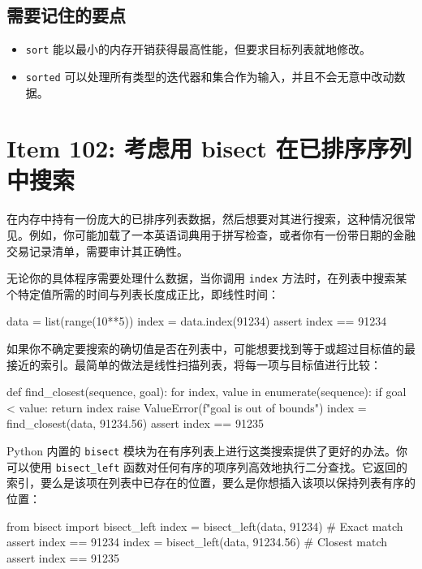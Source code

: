 \subsection{需要记住的要点}

\begin{itemize}
\item \texttt{sort} 能以最小的内存开销获得最高性能，但要求目标列表就地修改。
\item \texttt{sorted} 可以处理所有类型的迭代器和集合作为输入，并且不会无意中改动数据。
\end{itemize}

\section{Item 102: 考虑用 bisect 在已排序序列中搜索}

在内存中持有一份庞大的已排序列表数据，然后想要对其进行搜索，这种情况很常见。例如，你可能加载了一本英语词典用于拼写检查，或者你有一份带日期的金融交易记录清单，需要审计其正确性。

无论你的具体程序需要处理什么数据，当你调用 \texttt{index} 方法时，在列表中搜索某个特定值所需的时间与列表长度成正比，即线性时间：

\begin{codebox}[python]
data = list(range(10**5))
index = data.index(91234)
assert index == 91234
\end{codebox}

如果你不确定要搜索的确切值是否在列表中，可能想要找到等于或超过目标值的最接近的索引。最简单的做法是线性扫描列表，将每一项与目标值进行比较：

\begin{codebox}[python]
def find_closest(sequence, goal):
    for index, value in enumerate(sequence):
        if goal < value:
            return index
    raise ValueError(f"{goal} is out of bounds")
index = find_closest(data, 91234.56)
assert index == 91235
\end{codebox}

Python 内置的 \texttt{bisect} 模块为在有序列表上进行这类搜索提供了更好的办法。你可以使用 \texttt{bisect\_left} 函数对任何有序的项序列高效地执行二分查找。它返回的索引，要么是该项在列表中已存在的位置，要么是你想插入该项以保持列表有序的位置：

\begin{codebox}[python]
from bisect import bisect_left
index = bisect_left(data, 91234)     # Exact match
assert index == 91234
index = bisect_left(data, 91234.56)  # Closest match
assert index == 91235
\end{codebox}

